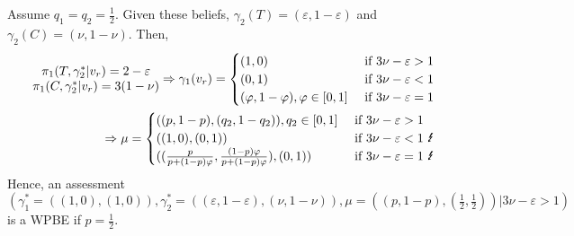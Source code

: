 \documentclass[]{article}
\begin{document}
Assume $q_1 = q_2 = \frac{1}{2}$. Given these beliefs, $\gamma_2(T) = (\varepsilon, 1 - \varepsilon)$ and $\gamma_2(C) = (\nu, 1 - \nu)$. Then,
\begin{equation}
	\begin{split}
		\begin{matrix}
			\pi_1(T, \gamma_2^*|v_r) = 2 - \varepsilon \\ \nonumber
			\pi_1(C, \gamma_2^*|v_r) = 3(1 - \nu)
		\end{matrix} \Rightarrow \gamma_1(v_r) = \begin{cases}
			(1, 0) & \text{ if } 3\nu - \varepsilon > 1 \\
			(0, 1) & \text{ if } 3\nu - \varepsilon < 1 \\
			(\varphi, 1 - \varphi), \varphi\in[0, 1] & \text{ if } 3\nu - \varepsilon = 1
		\end{cases} \\
		\Rightarrow \mu = \begin{cases}
			((p, 1 - p), (q_2, 1 - q_2)), q_2\in [0, 1] &\text{ if } 3\nu - \varepsilon > 1 \\
			((1, 0), (0, 1)) &\text{ if } 3\nu - \varepsilon < 1\text{ \Lightning}\\
			((\frac{p}{p + (1 - p)\varphi}, \frac{(1 - p)\varphi}{p + (1 - p)\varphi}), (0, 1)) &\text{ if } 3\nu - \varepsilon = 1\text{ \Lightning}\\
		\end{cases}
	\end{split}
\end{equation}
Hence, an assessment $(\gamma_1^* = ((1, 0), (1, 0)), \gamma_2^* = ((\varepsilon, 1 - \varepsilon), (\nu, 1 - \nu)), \mu = ((p, 1 - p), (\frac{1}{2}, \frac{1}{2}))| 3\nu - \varepsilon > 1)$ is a WPBE if $p = \frac{1}{2}$.
\end{document}
